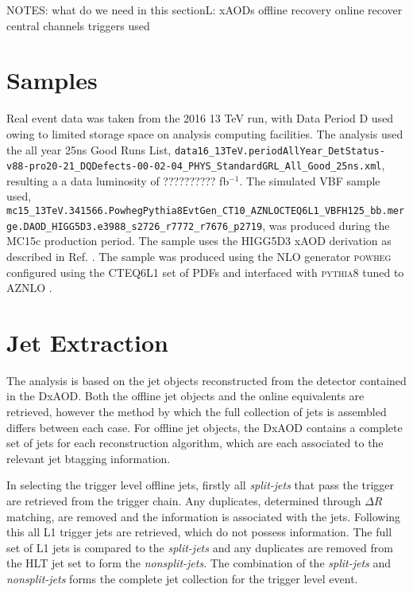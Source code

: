 NOTES:
what do we need in this sectionL:
	xAODs
	offline recovery
	online recover
	central channels
	triggers used


	\section{Samples}
		 Real event data was taken from the 2016 13 TeV run, with Data Period D used owing to limited storage space on analysis computing facilities. The analysis used the all year 25ns Good Runs List, \verb|data16_13TeV.periodAllYear_DetStatus-v88-pro20-21_DQDefects-00-02-04_PHYS_StandardGRL_All_Good_25ns.xml|, resulting a a data luminosity of ?????????? fb$^{-1}$. The simulated VBF sample used, \verb|mc15_13TeV.341566.PowhegPythia8EvtGen_CT10_AZNLOCTEQ6L1_VBFH125_bb.merge.DAOD_HIGG5D3.e3988_s2726_r7772_r7676_p2719|, was produced during the MC15c production period. The sample uses the HIGG5D3 xAOD derivation as described in Ref. \cite{HIGG5D3}. The sample was produced using the NLO generator \textsc{powheg} configured using the CTEQ6L1 \cite{CTEQ} set of PDFs and interfaced with \textsc{pythia8} tuned to AZNLO \cite{AZNLO}.




	\section{Jet Extraction}

		The analysis is based on the jet objects reconstructed from the detector contained in the DxAOD. Both the offline jet objects and the online equivalents are retrieved, however the method by which the full collection of jets is assembled differs between each case. For offline jet objects, the DxAOD contains a complete set of jets for each reconstruction algorithm, which are each associated to the relevant jet btagging information.

		In selecting the trigger level offline jets, firstly all \textit{split-jets} that pass the trigger are retrieved from the trigger chain. Any duplicates, determined through $\Delta R$ matching, are removed and the \btag information is associated with the jets. Following this all L1 trigger jets are retrieved, which do not possess \btag information. The full set of L1 jets is compared to the \textit{split-jets} and any duplicates are removed from the HLT jet set to form the \textit{nonsplit-jets}. The combination of the \textit{split-jets} and \textit{nonsplit-jets} forms the complete jet collection for the trigger level event.

